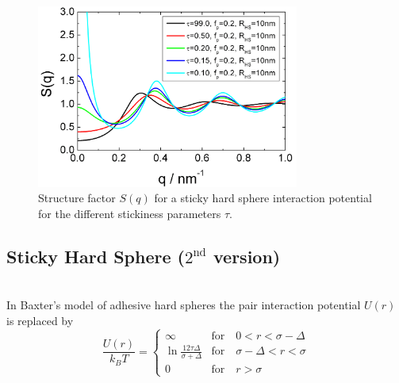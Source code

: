 \begin{figure}[htb]
\begin{center}
\includegraphics[width=0.768\textwidth,height=0.528\textwidth]{../images/structure_factor/HardSphere/StickyHardSphere1.png}
\end{center}
\caption{Structure factor $S(q)$ for a sticky hard sphere interaction potential for the different
stickiness parameters $\tau$.}
\label{fig:SQStickyHardSphere1}
\end{figure}

\clearpage
\subsection{Sticky Hard Sphere ($2^\text{nd}$ version)} \cite{Regnaut1989,Regnaut1990}~\\

In Baxter's model of adhesive hard spheres the pair interaction
potential $U(r)$ is replaced by
\begin{equation}
\frac{U(r)}{k_BT} =
 \begin{cases}
      \infty    & \text{for} \quad 0<r<\sigma-\Delta \\
      \ln\frac{12\tau\Delta}{\sigma+\Delta} & \text{for} \quad \sigma-\Delta<r<\sigma \\
      0         & \text{for} \quad r>\sigma
   \end{cases}
\end{equation}



